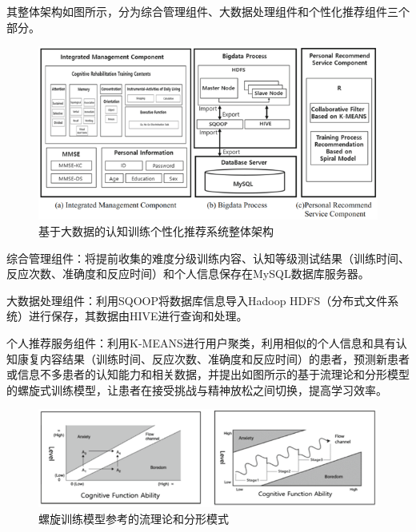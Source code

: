 \documentclass{article}
\begin{document}
            其整体架构如图所示，分为综合管理组件、大数据处理组件和个性化推荐组件三个部分。
            \begin{figure}[H]
            	
            	\centering
            	\includegraphics[scale=0.7]{images/Overall_architecture.png}
            	\caption{基于大数据的认知训练个性化推荐系统整体架构}
            	\label{fig:label}
            \end{figure}

            综合管理组件：将提前收集的难度分级训练内容、认知等级测试结果（训练时间、反应次数、准确度和反应时间）和个人信息保存在MySQL数据库服务器。
 
            大数据处理组件：利用SQOOP将数据库信息导入Hadoop HDFS（分布式文件系统）进行保存，其数据由HIVE进行查询和处理。

            个人推荐服务组件：利用K-MEANS进行用户聚类，利用相似的个人信息和具有认知康复内容结果（训练时间、反应次数、准确度和反应时间）的患者，预测新患者或信息不多患者的认知能力和相关数据，并提出如图所示的基于流理论和分形模型的螺旋式训练模型，让患者在接受挑战与精神放松之间切换，提高学习效率。
            \begin{figure}[H]
            	
            	\centering
            	\includegraphics[scale=0.7]{images/flow_theory.png}
            	\caption{螺旋训练模型参考的流理论和分形模式}
            	\label{fig:label}
            \end{figure}
            
\end{document}
